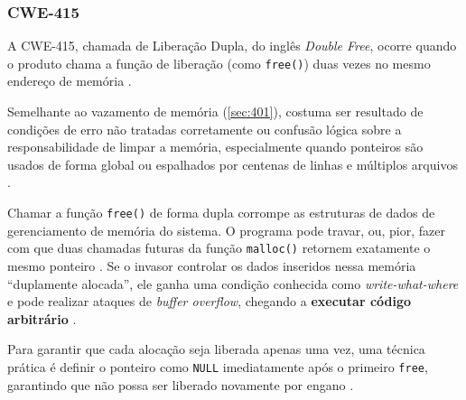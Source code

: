 \documentclass[
    12pt,                %
    openright,           %
    oneside,             %
    a4paper,             %
    english,             %
    brazil               %
]{abntex2}
\begin{document}
\begin{itemize}
\subsubsection{CWE-415}
\label{sec:415}
\par
A CWE-415, chamada de Liberação Dupla, do inglês \textit{Double Free}, ocorre quando o produto chama a função de liberação (como \texttt{free()}) duas vezes no mesmo endereço de memória \cite{cwe415}.
\par
Semelhante ao vazamento de memória (\ref{sec:401}), costuma ser resultado de condições de erro não tratadas corretamente ou confusão lógica sobre a responsabilidade de limpar a memória, especialmente quando ponteiros são usados de forma global ou espalhados por centenas de linhas e múltiplos arquivos \cite{cwe415}.
\par
Chamar a função \texttt{free()} de forma dupla corrompe as estruturas de dados de gerenciamento de memória do sistema.
O programa pode travar, ou, pior, fazer com que duas chamadas futuras da função \texttt{malloc()} retornem exatamente o mesmo ponteiro \cite{cwe415}.
Se o invasor controlar os dados inseridos nessa memória ``duplamente alocada'', ele ganha uma condição conhecida como \textit{write-what-where} e pode realizar ataques de \textit{buffer overflow}, chegando a \textbf{executar código arbitrário} \cite{cwe415}.
\par
Para garantir que cada alocação seja liberada apenas uma vez, uma técnica prática é definir o ponteiro como \texttt{NULL} imediatamente após o primeiro \texttt{free}, garantindo que não possa ser liberado novamente por engano \cite{cwe415}.


\end{itemize}
\end{document}
